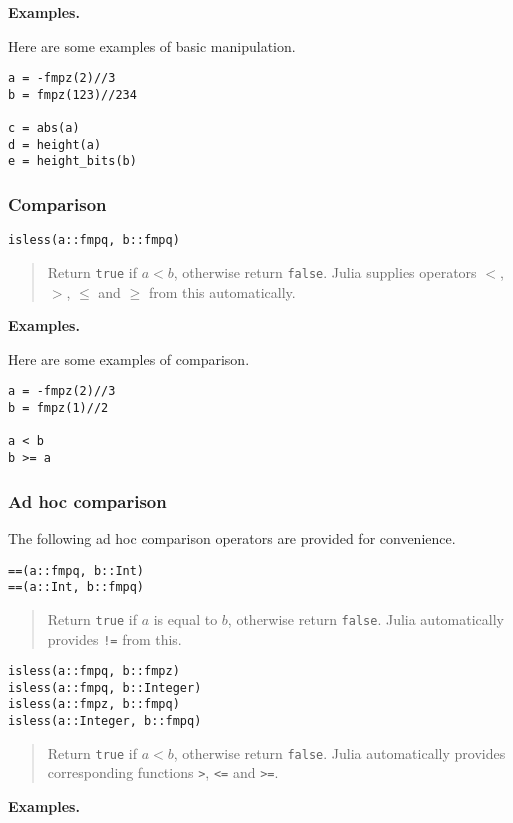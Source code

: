 \documentclass[a4paper,10pt]{article}
\newcommand{\code}{\lstinline}
\newcommand{\desc}[1]{\vspace{-3mm}\begin{quote}#1\end{quote}}
\begin{document}
{{\textbf{Examples.}

Here are some examples of basic manipulation.

\begin{lstlisting}
a = -fmpz(2)//3
b = fmpz(123)//234

c = abs(a)
d = height(a)
e = height_bits(b)
\end{lstlisting}

\subsubsection{Comparison}

\begin{lstlisting}
isless(a::fmpq, b::fmpq) 
\end{lstlisting}

\desc{Return \code{true} if $a < b$, otherwise return \code{false}. Julia
supplies operators $<$, $>$, $\leq$ and $\geq$ from this automatically.}

\textbf{Examples.}

Here are some examples of comparison.

\begin{lstlisting}
a = -fmpz(2)//3
b = fmpz(1)//2

a < b
b >= a
\end{lstlisting}

\subsubsection{Ad hoc comparison}

The following ad hoc comparison operators are provided for convenience.

\begin{lstlisting}
==(a::fmpq, b::Int)
==(a::Int, b::fmpq)
\end{lstlisting}

\desc{Return \code{true} if $a$ is equal to $b$, otherwise return \code{false}. Julia
automatically provides \code{!=} from this.}

\begin{lstlisting}
isless(a::fmpq, b::fmpz)
isless(a::fmpq, b::Integer)
isless(a::fmpz, b::fmpq)
isless(a::Integer, b::fmpq)
\end{lstlisting}

\desc{Return \code{true} if $a < b$, otherwise return \code{false}. Julia
automatically provides corresponding functions \code{>}, \code{<=} and
\code{>=}.}

\textbf{Examples.}

}}
\end{document}
